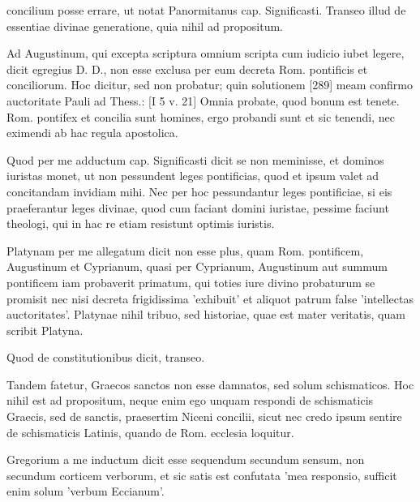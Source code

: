 concilium posse errare, ut notat Panormitanus cap. Significasti. Transeo illud de essentiae divinae generatione, quia nihil ad propositum.

Ad Augustinum, qui excepta scriptura omnium scripta cum iudicio iubet legere, dicit egregius D. D., non esse exclusa per eum decreta Rom. pontificis et conciliorum. Hoc dicitur, sed non probatur; quin solutionem [289] meam confirmo auctoritate Pauli ad Thess.: [I 5 v. 21] Omnia probate, quod bonum est tenete. Rom. pontifex et concilia sunt homines, ergo probandi sunt et sic tenendi, nec eximendi ab hac regula apostolica.

Quod per me adductum cap. Significasti dicit se non meminisse, et dominos iuristas monet, ut non pessundent leges pontificias, quod et ipsum valet ad concitandam invidiam mihi. Nec per hoc pessundantur leges pontificiae, si eis praeferantur leges divinae, quod cum faciant domini iuristae, pessime faciunt theologi, qui in hac re etiam resistunt optimis iuristis.

Platynam per me allegatum dicit non esse plus, quam Rom. pontificem, Augustinum et Cyprianum, quasi per Cyprianum, Augustinum aut summum pontificem iam probaverit primatum, qui toties iure divino probaturum se promisit nec nisi decreta frigidissima 'exhibuit' et aliquot patrum false 'intellectas auctoritates'. Platynae nihil tribuo, sed historiae, quae est mater veritatis, quam scribit Platyna.

Quod de constitutionibus dicit, transeo.

Tandem fatetur, Graecos sanctos non esse damnatos, sed solum schismaticos. Hoc nihil est ad propositum, neque enim ego unquam respondi de schismaticis Graecis, sed de sanctis, praesertim Niceni concilii, sicut nec credo ipsum sentire de schismaticis Latinis, quando de Rom. ecclesia loquitur.

Gregorium a me inductum dicit esse sequendum secundum sensum, non secundum corticem verborum, et sic satis est confutata 'mea responsio, sufficit enim solum 'verbum Eccianum'.

